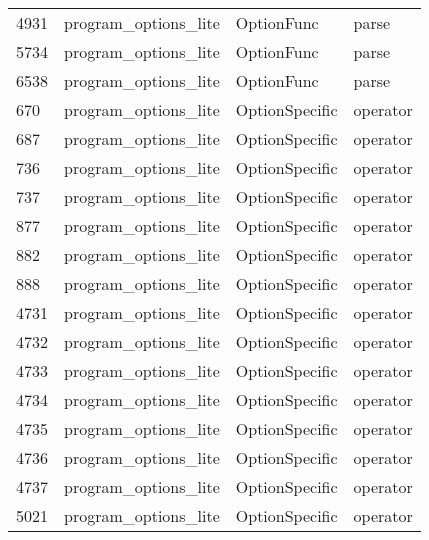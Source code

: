 \begin{tabular}{llll}
4931 &  program\_options\_lite &                 OptionFunc &                                     parse \\
5734 &  program\_options\_lite &                 OptionFunc &                                     parse \\
6538 &  program\_options\_lite &                 OptionFunc &                                     parse \\
670  &  program\_options\_lite &             OptionSpecific &                                  operator \\
687  &  program\_options\_lite &             OptionSpecific &                                  operator \\
736  &  program\_options\_lite &             OptionSpecific &                                  operator \\
737  &  program\_options\_lite &             OptionSpecific &                                  operator \\
877  &  program\_options\_lite &             OptionSpecific &                                  operator \\
882  &  program\_options\_lite &             OptionSpecific &                                  operator \\
888  &  program\_options\_lite &             OptionSpecific &                                  operator \\
4731 &  program\_options\_lite &             OptionSpecific &                                  operator \\
4732 &  program\_options\_lite &             OptionSpecific &                                  operator \\
4733 &  program\_options\_lite &             OptionSpecific &                                  operator \\
4734 &  program\_options\_lite &             OptionSpecific &                                  operator \\
4735 &  program\_options\_lite &             OptionSpecific &                                  operator \\
4736 &  program\_options\_lite &             OptionSpecific &                                  operator \\
4737 &  program\_options\_lite &             OptionSpecific &                                  operator \\
5021 &  program\_options\_lite &             OptionSpecific &                                  operator \\

\end{tabular}
